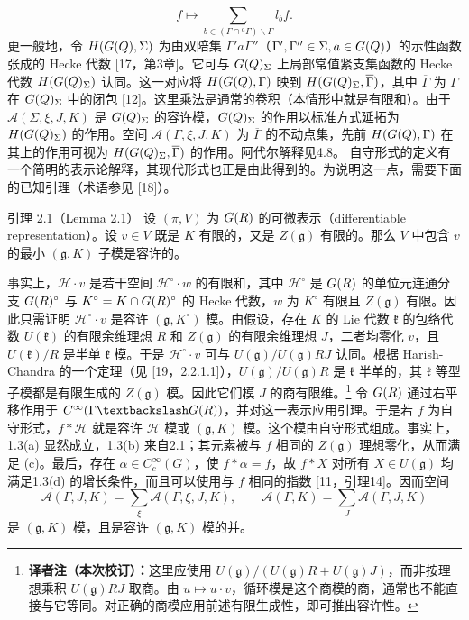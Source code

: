 \[
f\longmapsto\sum_{b\in(\Gamma\cap{}^a\Gamma)\backslash\Gamma}l_b f.
\]
更一般地，令 $H(G(Q),\Sigma)$ 为由双陪集 $\Gamma'a\Gamma''$（$\Gamma',\Gamma''\in\Sigma,a\in G(Q)$）的示性函数张成的 Hecke 代数 [17，第3章]。它可与 $G(Q)_\Sigma$ 上局部常值紧支集函数的 Hecke 代数 $H(G(Q)_\Sigma)$ 认同。这一对应将 $H(G(Q),\Gamma)$ 映到 $H(G(Q)_\Sigma,\overline\Gamma)$，其中 $\overline\Gamma$ 为 $\Gamma$ 在 $G(Q)_\Sigma$ 中的闭包 [12]。这里乘法是通常的卷积（本情形中就是有限和）。由于 $\mathcal A(\Sigma,\xi,J,K)$ 是 $G(Q)_\Sigma$ 的容许模，$G(Q)_\Sigma$ 的作用以标准方式延拓为 $H(G(Q)_\Sigma)$ 的作用。空间 $\mathcal A(\Gamma,\xi,J,K)$ 为 $\overline\Gamma$ 的不动点集，先前 $H(G(Q),\Gamma)$ 在其上的作用可视为 $H(G(Q)_\Sigma,\overline\Gamma)$ 的作用。阿代尔解释见4.8。
自守形式的定义有一个简明的表示论解释，其现代形式也正是由此得到的。为说明这一点，需要下面的已知引理（术语参见 [18]）。
\begin{originaltheorem}{引理 2.1（Lemma 2.1）}
设 $(\pi,V)$ 为 $G(R)$ 的可微表示（differentiable representation）。设 $v\in V$ 既是 $K$ 有限的，又是 $Z(\mathfrak g)$ 有限的。那么 $V$ 中包含 $v$ 的最小 $(\mathfrak g,K)$ 子模是容许的。
\end{originaltheorem}
事实上，$\mathcal H\cdot v$ 是若干空间 $\mathcal H^\circ\cdot w$ 的有限和，其中 $\mathcal H^\circ$ 是 $G(R)$ 的单位元连通分支 $G(R)^\circ$ 与 $K^\circ=K\cap G(R)^\circ$ 的 Hecke 代数，$w$ 为 $K^\circ$ 有限且 $Z(\mathfrak g)$ 有限。因此只需证明 $\mathcal H^\circ\cdot v$ 是容许 $(\mathfrak g,K^\circ)$ 模。由假设，存在 $K$ 的 Lie 代数 $\mathfrak k$ 的包络代数 $U(\mathfrak k)$ 的有限余维理想 $R$ 和 $Z(\mathfrak g)$ 的有限余维理想 $J$，二者均零化 $v$，且 $U(\mathfrak k)/R$ 是半单 $\mathfrak k$ 模。于是 $\mathcal H^\circ\cdot v$ 可与 $U(\mathfrak g)/U(\mathfrak g)RJ$ 认同。根据 Harish-Chandra 的一个定理（见 [19，2.2.1.1]），$U(\mathfrak g)/U(\mathfrak g)R$ 是 $\mathfrak k$ 半单的，其 $\mathfrak k$ 等型子模都是有限生成的 $Z(\mathfrak g)$ 模。因此它们模 $J$ 的商有限维。\footnote{\textbf{译者注（本次校订）：}这里应使用 $U(\mathfrak g)/(U(\mathfrak g)R+U(\mathfrak g)J)$，而非按理想乘积 $U(\mathfrak g)RJ$ 取商。由 $u\mapsto u\cdot v$，循环模是这个商模的商，通常也不能直接与它等同。对正确的商模应用前述有限生成性，即可推出容许性。}
令 $G(R)$ 通过右平移作用于 $C^\infty(\Gamma\backslash G(\R))$，并对这一表示应用引理。于是若 $f$ 为自守形式，$f*\mathcal H$ 就是容许 $\mathcal H$ 模或 $(\mathfrak g,K)$ 模。这个模由自守形式组成。事实上，1.3(a) 显然成立，1.3(b) 来自2.1；其元素被与 $f$ 相同的 $Z(\mathfrak g)$ 理想零化，从而满足 (c)。最后，存在 $\alpha\in C_c^\infty(G)$，使 $f*\alpha=f$，故 $f*X$ 对所有 $X\in U(\mathfrak g)$ 均满足1.3(d) 的增长条件，而且可以使用与 $f$ 相同的指数 [11，引理14]。因而空间
\[
\mathcal A(\Gamma,J,K)=\sum_\xi\mathcal A(\Gamma,\xi,J,K),\qquad
\mathcal A(\Gamma,K)=\sum_J\mathcal A(\Gamma,J,K)
\]
是 $(\mathfrak g,K)$ 模，且是容许 $(\mathfrak g,K)$ 模的并。

